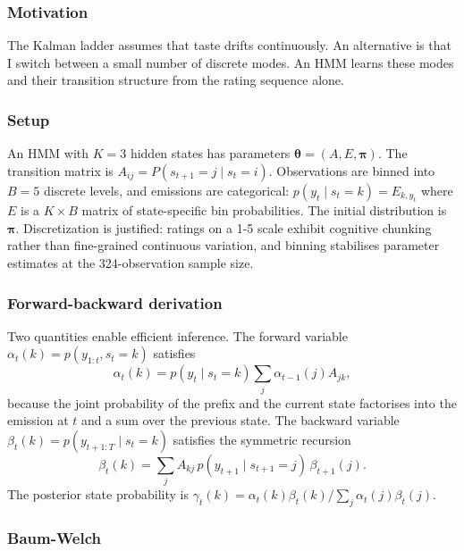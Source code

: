 \documentclass{article}
\begin{document}
\subsubsection*{Motivation}

The Kalman ladder assumes that taste drifts continuously. An alternative is that I switch between a small number of discrete modes. An HMM learns these modes and their transition structure from the rating sequence alone.

\subsubsection*{Setup}

An HMM with $K = 3$ hidden states has parameters $\boldsymbol{\theta} = (A, E, \boldsymbol{\pi})$. The transition matrix is $A_{ij} = P(s_{t+1} = j \mid s_t = i)$. Observations are binned into $B = 5$ discrete levels, and emissions are categorical: $p(y_t \mid s_t = k) = E_{k, y_t}$ where $E$ is a $K \times B$ matrix of state-specific bin probabilities. The initial distribution is $\boldsymbol{\pi}$. Discretization is justified: ratings on a 1-5 scale exhibit cognitive chunking rather than fine-grained continuous variation, and binning stabilises parameter estimates at the 324-observation sample size.

\subsubsection*{Forward-backward derivation}

Two quantities enable efficient inference. The forward variable $\alpha_t(k) = p(y_{1:t}, s_t = k)$ satisfies
\begin{equation}
\alpha_t(k) = p(y_t \mid s_t = k) \sum_j \alpha_{t-1}(j) A_{jk},
\label{eq:forward}
\end{equation}
because the joint probability of the prefix and the current state factorises into the emission at $t$ and a sum over the previous state. The backward variable $\beta_t(k) = p(y_{t+1:T} \mid s_t = k)$ satisfies the symmetric recursion
\begin{equation}
\beta_t(k) = \sum_j A_{kj} \, p(y_{t+1} \mid s_{t+1} = j) \, \beta_{t+1}(j).
\label{eq:backward}
\end{equation}
The posterior state probability is $\gamma_t(k) = \alpha_t(k) \beta_t(k) / \sum_j \alpha_t(j) \beta_t(j)$.

\subsubsection*{Baum-Welch}
\end{document}
